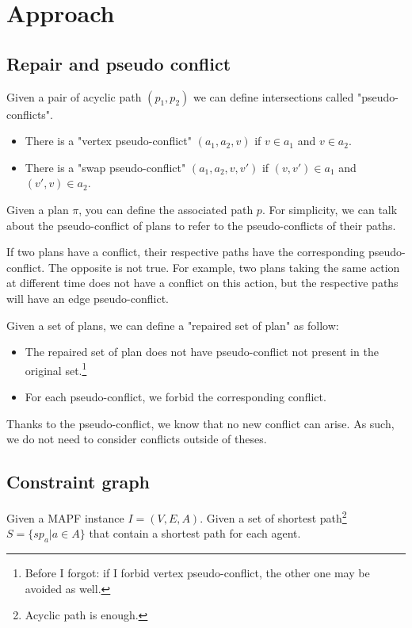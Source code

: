 \section{Approach}\label{sec:approach}

\subsection{Repair and pseudo conflict}
Given a pair of acyclic path $(p_1,p_2)$ we can define intersections called "pseudo-conflicts".

\begin{itemize}
  \item There is a "vertex pseudo-conflict" $(a_1,a_2,v)$ if $v \in a_1$ and $v \in a_2$.
  \item There is a "swap pseudo-conflict" $(a_1,a_2,v,v')$ if $(v,v') \in a_1$ and $(v',v) \in a_2$.
\end{itemize}

Given a plan $\pi$, you can define the associated path $p$. For simplicity, we can talk about the pseudo-conflict of plans to refer to the pseudo-conflicts of their paths.

If two plans have a conflict, their respective paths have the corresponding pseudo-conflict. The opposite is not true. For example, two plans taking the same action at different time does not have a conflict on this action, but the respective paths will have an edge pseudo-conflict.

Given a set of plans, we can define a "repaired set of plan" as follow:
\begin{itemize}
  \item The repaired set of plan does not have pseudo-conflict not present in the original set.\footnote{Before I forgot: if I forbid vertex pseudo-conflict, the other one may be avoided as well.}
  \item For each pseudo-conflict, we forbid the corresponding conflict.
\end{itemize}
Thanks to the pseudo-conflict, we know that no new conflict can arise. As such, we do not need to consider conflicts outside of theses.

\subsection{Constraint graph}
Given a MAPF instance $I=(V,E,A)$.
Given a set of shortest path\footnote{Acyclic path is enough.} $S = \{sp_a | a \in A \}$ that contain a shortest path for each agent.

